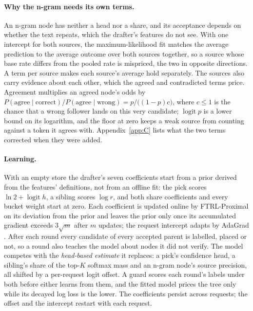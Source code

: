 \documentclass[10pt,twocolumn,letterpaper]{article}
\DeclareMathOperator{\logit}{logit}
\begin{document}
\paragraph{Why the n-gram needs its own terms.} An n-gram node has neither a head nor a share, and its acceptance depends on whether the text repeats, which the drafter's features do not see. With one intercept for both sources, the maximum-likelihood fit matches the average prediction to the average outcome over both sources together, so a source whose base rate differs from the pooled rate is mispriced, the two in opposite directions. A term per source makes each source's average hold separately. The sources also carry evidence about each other, which the agreed and contradicted terms price. Agreement multiplies an agreed node's odds by $P(\text{agree} \mid \text{correct}) / P(\text{agree} \mid \text{wrong}) = p/\bigl((1-p)c\bigr)$, where $c \leq 1$ is the chance that a wrong follower lands on this very candidate; $\logit p$ is a lower bound on its logarithm, and the floor at zero keeps a weak source from counting against a token it agrees with. Appendix~\ref{app:C} lists what the two terms corrected when they were added.

\paragraph{Learning.} With an empty store the drafter's seven coefficients start from a prior derived from the features' definitions, not from an offline fit: the pick scores $\ln 2 + \logit h$, a sibling scores $\log r$, and both share coefficients and every bucket weight start at zero. Each coefficient is updated online by FTRL-Proximal on its deviation from the prior and leaves the prior only once its accumulated gradient exceeds $3\sqrt{m}$ after $m$ updates; the request intercept adapts by AdaGrad \cite{duchi2011adaptive}. After each round every candidate of every accepted parent is labelled, placed or not, so a round also teaches the model about nodes it did not verify. The model competes with the \emph{head-based estimate} it replaces: a pick's confidence head, a sibling's share of the top-$K$ softmax mass and an n-gram node's source precision, all shifted by a per-request logit offset. A guard scores each round's labels under both before either learns from them, and the fitted model prices the tree only while its decayed log loss is the lower. The coefficients persist across requests; the offset and the intercept restart with each request.
\end{document}
